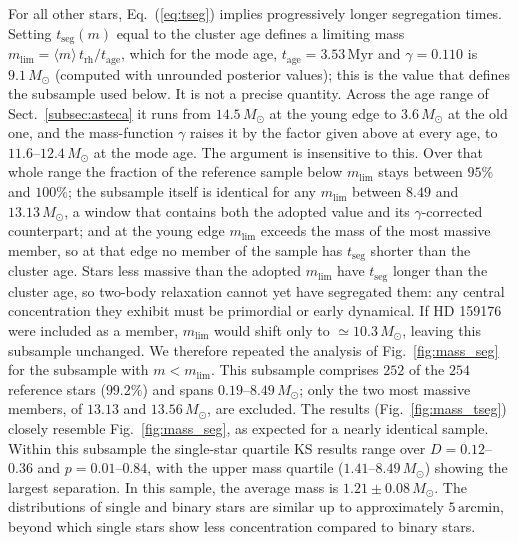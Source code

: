 \documentclass{aa}
\begin{document}
For all other stars, Eq.~(\ref{eq:tseg}) implies progressively longer segregation times. Setting $t_{\mathrm{seg}}(m)$ equal to the cluster age defines a limiting mass $m_{\mathrm{lim}} = \langle m \rangle\, t_{\mathrm{rh}}/t_{\mathrm{age}}$, which for the mode age, $t_{\mathrm{age}} = 3.53\,\mathrm{Myr}$ and $\gamma=0.110$ is $9.1\,M_\odot$ (computed with unrounded posterior values); this is the value that defines the subsample used below. It is not a precise quantity. Across the age range of Sect.~\ref{subsec:asteca} it runs from $14.5\,M_\odot$ at the young edge to $3.6\,M_\odot$ at the old one, and the mass-function $\gamma$ raises it by the factor given above at every age, to $11.6$--$12.4\,M_\odot$ at the mode age. The argument is insensitive to this. Over that whole range the fraction of the reference sample below $m_{\mathrm{lim}}$ stays between $95\%$ and $100\%$; the subsample itself is identical for any $m_{\mathrm{lim}}$ between $8.49$ and $13.13\,M_\odot$, a window that contains both the adopted value and its $\gamma$-corrected counterpart; and at the young edge $m_{\mathrm{lim}}$ exceeds the mass of the most massive member, so at that edge no member of the sample has $t_{\mathrm{seg}}$ shorter than the cluster age. Stars less massive than the adopted $m_{\mathrm{lim}}$ have $t_{\mathrm{seg}}$ longer than the cluster age, so two-body relaxation cannot yet have segregated them: any central concentration they exhibit must be primordial or early dynamical. If HD 159176 were included as a member, $m_{\mathrm{lim}}$ would shift only to $\simeq10.3\,M_\odot$, leaving this subsample unchanged. We therefore repeated the analysis of Fig.~\ref{fig:mass_seg} for the subsample with $m < m_{\mathrm{lim}}$. This subsample comprises $252$ of the $254$ reference stars ($99.2\%$) and spans $0.19$--$8.49\,M_\odot$; only the two most massive members, of $13.13$ and $13.56\,M_\odot$, are excluded. The results (Fig.~\ref{fig:mass_tseg}) closely resemble Fig.~\ref{fig:mass_seg}, as expected for a nearly identical sample. Within this subsample the single-star quartile KS results range over $D=0.12$--$0.36$ and $p=0.01$--$0.84$, with the upper mass quartile ($1.41$--$8.49\,M_\odot$) showing the largest separation. In this sample, the average mass is $1.21 \pm 0.08\,M_\odot$. The distributions of single and binary stars are similar up to approximately $5\,\mathrm{arcmin}$, beyond which single stars show less concentration compared to binary stars.
\end{document}

